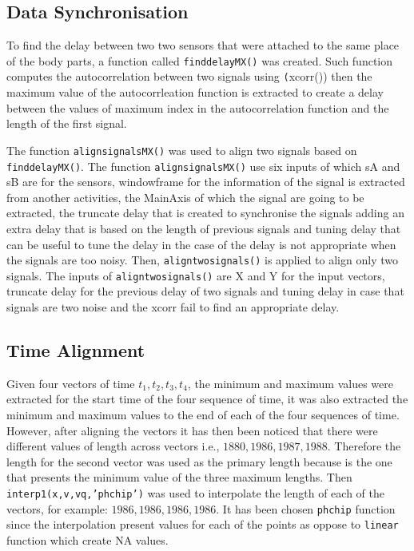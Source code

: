 \subsection{Data Synchronisation}
To find the delay between two two sensors that were attached to the same place
of the body parts, a function called  \texttt{finddelayMX()} was created.
Such function computes the autocorrelation between two signals using 
\texttt(xcorr())
then the maximum value of the autocorrleation function is extracted
to create a delay between the values of maximum index in the autocorrelation
function and the length of the first signal.

The function \texttt{alignsignalsMX()} was used to align two signals based
on \texttt{finddelayMX()}. The function \texttt{alignsignalsMX()} use six inputs
of which sA and sB are for the sensors, windowframe for the information
of the signal is extracted from another activities, 
the MainAxis of which the signal are going to be extracted, 
the truncate delay that is created to
synchronise the signals adding an extra delay that is based on the length of
previous signals 
and tuning delay that can be useful to tune the delay in the
case of the delay is not appropriate when the signals are too noisy.
Then, \texttt{aligntwosignals()} is applied to align only two signals.
The inputs of \texttt{aligntwosignals()} are X and Y for the input vectors,
truncate delay for the previous delay of two signals and tuning delay
in case that signals are two noise and the xcorr fail to find an appropriate
delay.

\subsection{Time Alignment}
Given four vectors of time
$t_1, t_2, t_3, t_4$, the minimum and maximum values were extracted 
for the start time of the four sequence of time,
it was also extracted the minimum and maximum values to the
end of each of the four sequences of time.
However, after aligning the vectors it has then  been noticed that there were
different values of length across vectors i.e., $1880,1986,1987,1988$.
Therefore the length for the second vector was used as the primary length
because is the one that presents the minimum value of the three maximum
lengths. Then \texttt{interp1(x,v,vq,'phchip')}  was used to interpolate the
length of each of the vectors, for example: $1986,1986,1986,1986$.
It has been chosen \texttt{phchip} function since the interpolation present
values for each of the points as oppose to \texttt{linear} function
which create NA values.


